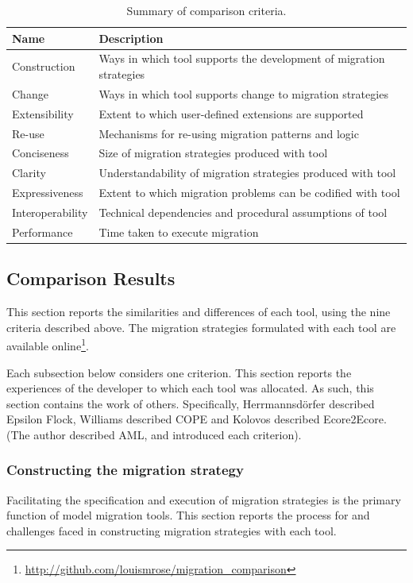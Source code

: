 \begin{table}[hbtp]
	\centering
	\begin{tabular}{|p{3cm}|p{9cm}|}
	\hline
	\textbf{Name}    & \textbf{Description} \\
	\hline
	Construction     & Ways in which tool supports the development of migration strategies \\
	\hline
	Change           & Ways in which tool supports change to migration strategies \\
	\hline
	Extensibility    & Extent to which user-defined extensions are supported \\
	\hline
	Re-use           & Mechanisms for re-using migration patterns and logic \\
	\hline
	Conciseness      & Size of migration strategies produced with tool \\
	\hline
	Clarity          & Understandability of migration strategies produced with tool \\
	\hline
	Expressiveness   & Extent to which migration problems can be codified with tool \\
	\hline
	Interoperability & Technical dependencies and procedural assumptions of tool \\
	\hline
	Performance      & Time taken to execute migration \\
	\hline
	\end{tabular}
	\caption{Summary of comparison criteria.}
	\label{tab:criteria}
\end{table}


\subsection{Comparison Results}
\label{sec:results}
This section reports the similarities and differences of each tool, using the nine criteria described above. The migration strategies formulated with each tool are available online\footnote{\url{http://github.com/louismrose/migration_comparison}}. 

Each subsection below considers one criterion. This section reports the experiences of the developer to which each tool was allocated. As such, this section contains the work of others. Specifically, Herrmannsd\"{o}rfer described Epsilon Flock, Williams described COPE and Kolovos described Ecore2Ecore. (The author described AML, and introduced each criterion). 

\subsubsection{Constructing the migration strategy}
\label{subsec:constructing}
Facilitating the specification and execution of migration strategies is the primary function of model migration tools. This section reports the process for and challenges faced in constructing migration strategies with each tool.

